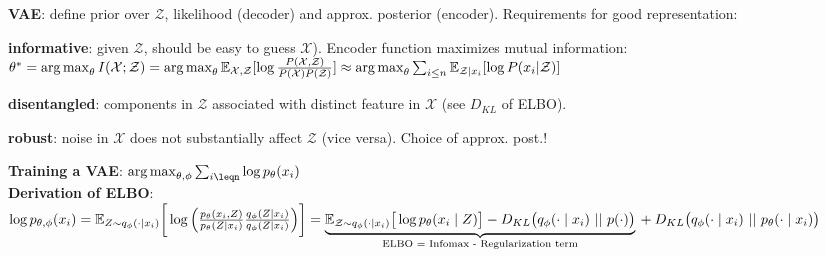 \textbf{VAE}: define prior over $\mathcal{Z}$, likelihood (decoder) and approx. posterior (encoder). Requirements for good representation:\\
\begin{inparaitem}[\textbullet]
    \item \textbf{informative}: given $\mathcal{Z}$, should be easy to guess $\mathcal{X}$). Encoder function maximizes mutual information: $\theta^* = \operatorname*{arg\,max}_\theta I(\mathcal{X};\mathcal{Z})=\operatorname*{arg\,max}_\theta \mathbb E_{\mathcal{X},\mathcal{Z}}[\log\frac{P(\mathcal{X,\mathcal{Z}})}{P(\mathcal{X})P(\mathcal{Z})}]\\
    \approx \operatorname*{arg\,max}_\theta \sum_{i\leq n} \mathbb E_{\mathcal{Z}|x_i}[\log P(x_i|\mathcal{Z})]$\\
    \item \textbf{disentangled}: components in $\mathcal{Z}$ associated with distinct feature in $\mathcal{X}$ (see $D_{KL}$ of ELBO). \\
    \item \textbf{robust}: noise in $\mathcal{X}$ does not substantially affect $\mathcal{Z}$ (vice versa). Choice of approx. post.!\\
\end{inparaitem}

\textbf{Training a VAE}: $\argmax_{\theta,\phi}\sum_{i\leqn}\log p_{\theta}(x_i)$\\
\textbf{Derivation of ELBO}:
$
    \log p_{\theta, \phi}(x_i)
    = \mathbb E_{Z \sim q_{\phi}(\cdot \mid x_i)}
    \bigg[ \log \Big(
    \frac{p_\theta(x_i, Z)}{p_\theta (Z \mid x_i)}
    \frac{q_\phi(Z \mid x_i)}{q_\phi(Z \mid x_i)}
    \Big) \bigg]
    =
    \underbrace{\mathbb E_{\mathcal{Z} \sim q_{\phi}(\cdot \mid x_i) } \big[
        \log p_{\theta}(x_i \mid Z)
    \big]
    - D_{KL} \big(
        q_\phi(\cdot \mid x_i)\ ||\ p(\cdot)
    \big)}_\text{ELBO = Infomax - Regularization term}\\
    + D_{KL} \big(
        q_\phi(\cdot \mid x_i)\ ||\ p_\theta(\cdot \mid x_i)
    \big)
$


